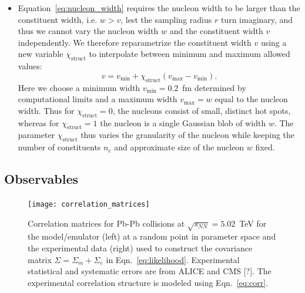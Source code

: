 \documentclass[aps,prc,reprint,amsmath,nofootinbib]{revtex4-1}
\newcommand{\sqrts}{\sqrt{s_{NN}}}
\newcommand{\X}{\chi_\mathrm{struct}}
\newcommand{\note}{\textcolor{theblue}{[?]}}
\begin{document}
\begin{itemize}[leftmargin=2\parindent]
\item Equation~\eqref{eq:nucleon_width} requires the nucleon width to be larger than the constituent width, i.e. $w > v$, lest the sampling radius $r$ turn imaginary, and thus we cannot vary the nucleon width $w$ and the constituent width $v$ independently.
  We therefore reparametrize the constituent width $v$ using a new variable $\X$ to interpolate between minimum and maximum allowed values:
  \begin{equation}
    v = v_\mathrm{min} + \X (v_\mathrm{max} - v_\mathrm{min}).
  \end{equation}
  Here we choose a minimum width $v_\mathrm{min} = 0.2$~fm determined by computational limits and a maximum width $v_\mathrm{max} = w$ equal to the nucleon width.
  Thus for $\X=0$, the nucleons consist of small, distinct hot spots, whereas for $\X=1$ the nucleon is a single Gaussian blob of width $w$.
  The parameter $\X$ thus varies the granularity of the nucleon while keeping the number of constituents $n_c$ and approximate size of the nucleon $w$ fixed.
\end{itemize}

\subsection{Observables}

\begin{figure}[t]
  \texttt{[image: correlation\_matrices]}
  \caption{Correlation matrices for Pb-Pb collisions at $\sqrts=5.02$~TeV for the model/emulator (left) at a random point in parameter space and the experimental data (right) used to construct the covariance matrix ${\Sigma = \Sigma_m + \Sigma_e}$ in Eqn.~\eqref{eq:likelihood}. Experimental statistical and systematic errors are from ALICE and CMS \note. The experimental correlation structure is modeled using Eqn.~\eqref{eq:corr}.}
  \label{fig:correlation}
\end{figure}
\end{document}
